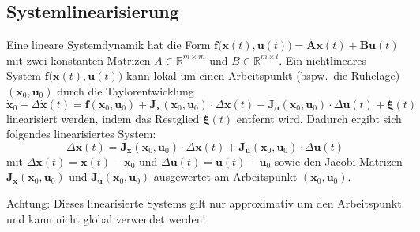 \documentclass[a4paper, 11pt, accentcolor = tud3b]{tudreport}
\newcommand{\R}{\mathbb{R}}
\newcommand{\mat}[1]{\boldsymbol{#1}}
\renewcommand{\vec}[1]{\boldsymbol{#1}}
\newcommand{\bspw}{bspw.~}
\begin{document}
			\subsection{Systemlinearisierung}
				Eine lineare Systemdynamik hat die Form \( \vec{f}\big(\vec{x}(t), \vec{u}(t)\big) = \mat{A} \vec{x}(t) + \mat{B} \vec{u}(t) \) mit zwei konstanten Matrizen \( A \in \R^{m \times m} \) und \( B \in \R^{m \times l} \). Ein nichtlineares System \( \vec{f}\big(\vec{x}(t), \vec{u}(t)\big) \) kann lokal um einen Arbeitspunkt (\bspw die Ruhelage) \( (\vec{x}_0, \vec{u}_0) \) durch die Taylorentwicklung
				\begin{equation*}
					\dot{\vec{x}}_0 + \Delta\dot{\vec{x}}(t) = \vec{f}(\vec{x}_0, \vec{u}_0) + \mat{J}_{\vec{x}}(\vec{x}_0, \vec{u}_0) \cdot \Delta\vec{x}(t) + \mat{J}_{\vec{u}}(\vec{x}_0, \vec{u}_0) \cdot \Delta\vec{u}(t) + \vec{\xi}(t)
				\end{equation*}
				linearisiert werden, indem das Restglied \(\vec{\xi}(t)\) entfernt wird. Dadurch ergibt sich folgendes linearisiertes System:
				\begin{equation*}
					\Delta\dot{\vec{x}}(t) = \mat{J}_{\vec{x}}(\vec{x}_0, \vec{u}_0) \cdot \Delta\vec{x}(t) + \mat{J}_{\vec{u}}(\vec{x}_0, \vec{u}_0) \cdot \Delta\vec{u}(t)
				\end{equation*}
				mit \( \Delta\vec{x}(t) = \vec{x}(t) - \vec{x}_0 \) und \( \Delta\vec{u}(t) = \vec{u}(t) - \vec{u}_0 \) sowie den Jacobi-Matrizen \( \mat{J}_{\vec{x}}(\vec{x}_0, \vec{u}_0) \) und \( \mat{J}_{\vec{u}}(\vec{x}_0, \vec{u}_0) \) ausgewertet am Arbeitspunkt \( (\vec{x}_0, \vec{u}_0) \).
				
				Achtung: Dieses linearisierte Systems gilt nur approximativ um den Arbeitspunkt und kann nicht global verwendet werden!
\end{document}
